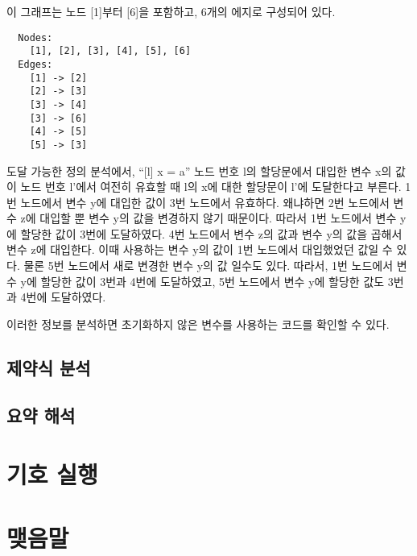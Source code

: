 \documentclass[a4paper]{book}
\begin{document}
이 그래프는 노드 [1]부터 [6]을 포함하고, 6개의 에지로 구성되어 있다.

\begin{center}
\begin{minipage}[h]{.7\textwidth}
  \begin{lstlisting}
  Nodes:
    [1], [2], [3], [4], [5], [6]
  Edges:
    [1] -> [2]
    [2] -> [3]
    [3] -> [4]
    [3] -> [6]
    [4] -> [5]
    [5] -> [3]
  \end{lstlisting}
\end{minipage}
\end{center}

도달 가능한 정의 분석에서, ``[l] x = a'' 노드 번호 l의 할당문에서
대입한 변수 x의 값이 노드 번호 l'에서 여전히 유효할 때 l의 x에 대한
할당문이 l'에 도달한다고 부른다.
%
1번 노드에서 변수 y에 대입한 값이 3번 노드에서 유효하다. 왜냐하면 2번
노드에서 변수 z에 대입할 뿐 변수 y의 값을 변경하지 않기 때문이다.
따라서 1번 노드에서 변수 y에 할당한 값이 3번에 도달하였다.
%
4번 노드에서 변수 z의 값과 변수 y의 값을 곱해서 변수 z에
대입한다. 이때 사용하는 변수 y의 값이 1번 노드에서 대입했었던 값일 수
있다. 물론 5번 노드에서 새로 변경한 변수 y의 값 일수도 있다.
%
따라서, 1번 노드에서 변수 y에 할당한 값이 3번과 4번에 도달하였고, 5번
노드에서 변수 y에 할당한 값도 3번과 4번에 도달하였다.
%

이러한 정보를 분석하면 초기화하지 않은 변수를 사용하는 코드를 확인할
수 있다.


\section{제약식 분석}

\section{요약 해석}

\chapter{기호 실행}

\chapter{맺음말}




\end{document}
